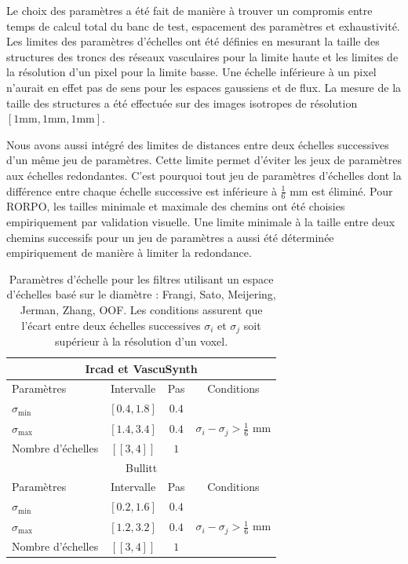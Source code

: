Le choix des paramètres a été fait de manière à trouver un compromis entre temps de calcul total du banc de test, espacement des paramètres et exhaustivité. Les limites des paramètres d'échelles ont été définies en mesurant la taille des structures des troncs des réseaux vasculaires pour la limite haute et les limites de la résolution d'un pixel pour la limite basse. Une échelle inférieure à un pixel n'aurait en effet pas de sens pour les espaces gaussiens et de flux. La mesure de la taille des structures a été effectuée sur des images isotropes de résolution $[1\textrm{mm},1\textrm{mm},1\textrm{mm}]$. 

Nous avons aussi intégré des limites de distances entre deux échelles successives d'un même jeu de paramètres. Cette limite permet d'éviter les jeux de paramètres aux échelles redondantes. C'est pourquoi tout jeu de paramètres d'échelles dont la différence entre chaque échelle successive est inférieure à $\frac{1}{6}$ mm est éliminé. Pour RORPO, les tailles minimale et maximale des chemins ont été choisies empiriquement par validation visuelle. Une limite minimale à la taille entre deux chemins successifs pour un jeu de paramètres a aussi été déterminée empiriquement de manière à limiter la redondance.

 \begin{table}[H]
  \caption{Paramètres d'échelle pour les filtres utilisant un espace d'échelles basé sur le diamètre :  Frangi, Sato, Meijering, Jerman, Zhang, OOF. Les conditions  assurent que l'écart entre deux échelles successives $\sigma_i$ et $\sigma_j$ soit supérieur à la résolution d'un voxel.}
  \label{tab:SS_interval}
  \begin{center}
    \begin{tabular}{  l  c  c  c }
      \hline
      \multicolumn{4}{c}{ Ircad et VascuSynth }\\
      \hline
      Paramètres & Intervalle & Pas & Conditions \\
      \hline
      $\sigma_{\min}$ & $[0.4,1.8]$ & $0.4$ & \\
      $\sigma_{\max}$ & $[1.4,3.4]$  & $0.4$ & $\sigma_{i} - \sigma_{j} > \frac{1}{6}$ mm \\ 
      Nombre d'échelles & $[\![3,4]\!]$ & $1$ & \\
      \hline
      \hline
      \multicolumn{4}{c}{ Bullitt }\\
      \hline
      Paramètres & Intervalle & Pas & Conditions \\
      \hline
      $\sigma_{\min}$ & $[0.2,1.6]$ & $0.4$ & \\
      $\sigma_{\max}$ & $[1.2,3.2]$  & $0.4$ & $\sigma_{i} - \sigma_{j} > \frac{1}{6}$ mm \\ 
      Nombre d'échelles & $[\![3,4]\!]$ & $1$ & \\
      \hline
    \end{tabular}
  \end{center}
\end{table}

